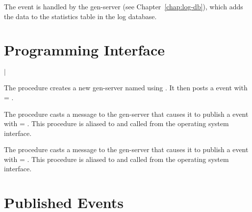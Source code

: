 The  event is handled by the 
gen-server (see Chapter~\ref{chap:log-db}), which adds the data to the
statistics table in the log database.

\section {Programming Interface}

\begin{procedure}
\end{procedure}
\returns{}
 $|$

The  procedure creates a new gen-server
named  using . It
then posts a  event with  =
.

\begin{procedure}
\end{procedure}

The  procedure casts a message to the
 gen-server that causes it to publish a
 event with  =
. This procedure is aliased to  and
called from the operating system interface.

\begin{procedure}
\end{procedure}

The  procedure casts a message to the
 gen-server that causes it to publish a
 event with  = .
This procedure is aliased to  and called from the
operating system interface.

\section {Published Events}

